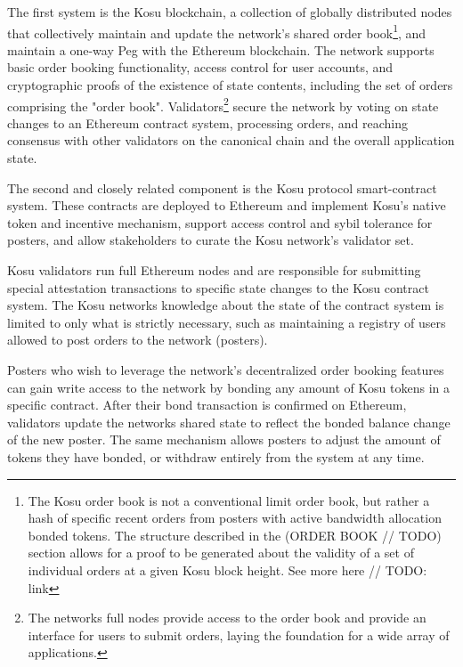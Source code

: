 \documentclass[10pt]{article}
\begin{document}
The first system is the Kosu blockchain, a collection of globally distributed nodes that collectively maintain and update the network’s shared order book\footnote{The Kosu order book is not a conventional limit order book, but rather a hash of specific recent orders from posters with active bandwidth allocation bonded tokens. The structure described in the (ORDER BOOK // TODO) section allows for a proof to be generated about the validity of a set of individual orders at a given Kosu block height.  See more here // TODO: link}, and maintain a one-way Peg with the Ethereum blockchain. The network supports basic order booking functionality, access control for user accounts, and cryptographic proofs of the existence of state contents, including the set of orders comprising the "order book". Validators\footnote{ The networks full nodes provide access to the order book and provide an interface for users to submit orders, laying the foundation for a wide array of applications.} secure the network by voting on state changes to an Ethereum contract system, processing orders, and reaching consensus with other validators on the canonical chain and the overall application state.
\medskip

The second and closely related component is the Kosu protocol smart-contract system. These contracts are deployed to Ethereum and implement Kosu’s native token and incentive mechanism, support access control and sybil tolerance for posters, and allow stakeholders to curate the Kosu network’s validator set.
\medskip

Kosu validators run full Ethereum nodes and are responsible for submitting special attestation transactions to specific state changes to the Kosu contract system. The Kosu networks knowledge about the state of the contract system is limited to only what is strictly necessary, such as maintaining a registry of users allowed to post orders to the network (posters).
\medskip

Posters who wish to leverage the network’s decentralized order booking features can gain write access to the network by bonding any amount of Kosu tokens in a specific contract. After their bond transaction is confirmed on Ethereum, validators update the networks shared state to reflect the bonded balance change of the new poster. The same mechanism allows posters to adjust the amount of tokens they have bonded, or withdraw entirely from the system at any time.
\medskip
\end{document}
